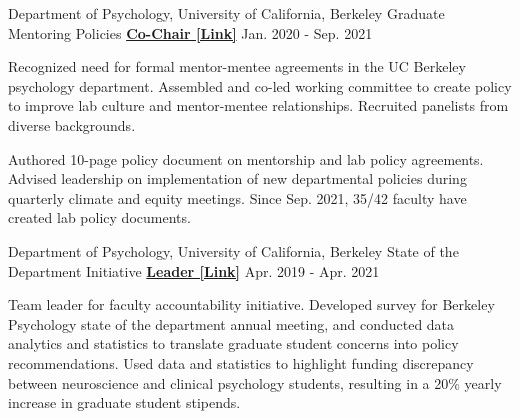 


\begin{cventries}

  \cventry 
    {Department of Psychology, University of California, Berkeley} %
    {Graduate Mentoring Policies}
    {\href{http://ivrylab.berkeley.edu/uploads/4/1/1/5/41152143/cognac_lab_policies_19feb2021.pdf}{\textbf{Co-Chair [Link]}}} %
    {Jan. 2020 - Sep. 2021} %
    {
      \begin{cvitems} %
        \item {Recognized need for formal mentor-mentee agreements in the UC Berkeley psychology department. Assembled and co-led working committee to create policy to improve lab culture and mentor-mentee relationships. Recruited panelists from diverse backgrounds.}
        \item {Authored 10-page policy document on mentorship and lab policy agreements. Advised leadership on implementation of new departmental policies during quarterly climate and equity meetings. Since Sep. 2021, 35/42 faculty have created lab policy documents.}
      \end{cvitems}
    }
    
    
  \cventry 
    {Department of Psychology, University of California, Berkeley} %
    {State of the Department Initiative}
    {\href{https://drive.google.com/file/d/1wD7y5gW39EU4vQUyhcrO7Fra1Ttc_HyG/view?usp=sharing}{\textbf{Leader [Link]}}} %
    {Apr. 2019 - Apr. 2021} %
    {
      \begin{cvitems} %
      	\item {Team leader for faculty accountability initiative. Developed survey for Berkeley Psychology state of the department annual meeting, and conducted data analytics and statistics to translate graduate student concerns into policy recommendations. Used data and statistics to highlight funding discrepancy between neuroscience and clinical psychology students, resulting in a 20\% yearly increase in graduate student stipends.}
      \end{cvitems}
    }

\end{cventries}

